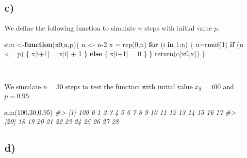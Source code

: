 \documentclass[
]{article}
\newenvironment{Shaded}{\begin{snugshade}}{\end{snugshade}}
\newcommand{\CommentTok}[1]{\textcolor[rgb]{0.56,0.35,0.01}{\textit{#1}}}
\newcommand{\ControlFlowTok}[1]{\textcolor[rgb]{0.13,0.29,0.53}{\textbf{#1}}}
\newcommand{\DecValTok}[1]{\textcolor[rgb]{0.00,0.00,0.81}{#1}}
\newcommand{\FloatTok}[1]{\textcolor[rgb]{0.00,0.00,0.81}{#1}}
\newcommand{\FunctionTok}[1]{\textcolor[rgb]{0.00,0.00,0.00}{#1}}
\newcommand{\NormalTok}[1]{#1}
\newcommand{\OtherTok}[1]{\textcolor[rgb]{0.56,0.35,0.01}{#1}}
\newcommand{\SpecialCharTok}[1]{\textcolor[rgb]{0.00,0.00,0.00}{#1}}
\begin{document}
\hypertarget{c-1}{%
\subsection{c)}\label{c-1}}

We define the following function to simulate \(n\) steps with initial
value \(p\).

\begin{Shaded}
\begin{Highlighting}[]
\NormalTok{sim }\OtherTok{\textless{}{-}}\ControlFlowTok{function}\NormalTok{(x0,n,p)\{ }
\NormalTok{    n }\OtherTok{\textless{}{-}}\NormalTok{ n}\DecValTok{{-}2}
\NormalTok{    x }\OtherTok{=} \FunctionTok{rep}\NormalTok{(}\DecValTok{0}\NormalTok{,n)}
    \ControlFlowTok{for}\NormalTok{ (i }\ControlFlowTok{in} \DecValTok{1}\SpecialCharTok{:}\NormalTok{n) \{}
\NormalTok{        u}\OtherTok{=}\FunctionTok{runif}\NormalTok{(}\DecValTok{1}\NormalTok{) }
        \ControlFlowTok{if}\NormalTok{ (u }\SpecialCharTok{\textless{}=}\NormalTok{ p) \{}
\NormalTok{            x[i}\SpecialCharTok{+}\DecValTok{1}\NormalTok{] }\OtherTok{=}\NormalTok{ x[i] }\SpecialCharTok{+} \DecValTok{1}
\NormalTok{        \} }\ControlFlowTok{else}\NormalTok{ \{}
\NormalTok{            x[i}\SpecialCharTok{+}\DecValTok{1}\NormalTok{] }\OtherTok{=} \DecValTok{0}
\NormalTok{        \}}
\NormalTok{    \} }
    \FunctionTok{return}\NormalTok{(}\FunctionTok{c}\NormalTok{(x0,x))}
\NormalTok{\}}
\end{Highlighting}
\end{Shaded}

~

We simulate \(n=30\) steps to test the function with initial value
\(x_{0} = 100\) and \(p=0.95\):

\begin{Shaded}
\begin{Highlighting}[]
\FunctionTok{sim}\NormalTok{(}\DecValTok{100}\NormalTok{,}\DecValTok{30}\NormalTok{,}\FloatTok{0.95}\NormalTok{)}
\CommentTok{\#\textgreater{}  [1] 100   0   1   2   3   4   5   6   7   8   9  10  11  12  13  14  15  16  17}
\CommentTok{\#\textgreater{} [20]  18  19  20  21  22  23  24  25  26  27  28}
\end{Highlighting}
\end{Shaded}

\hypertarget{d-1}{%
\subsection{d)}\label{d-1}}
\end{document}
